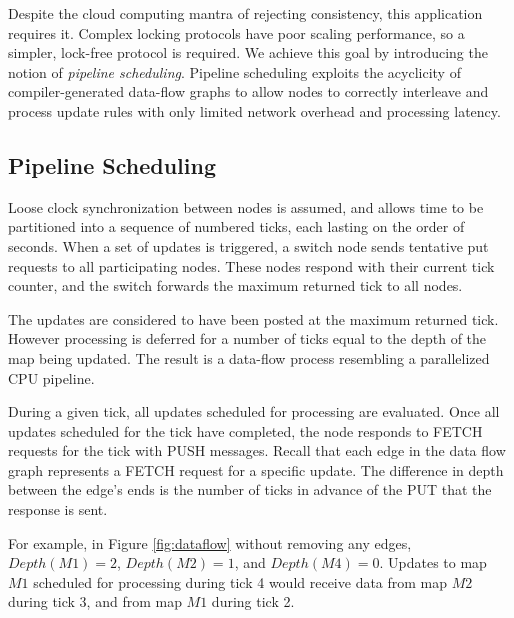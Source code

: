 \documentclass{sig-alternate}
\begin{document}
Despite the cloud computing mantra of rejecting consistency, this application requires it.  Complex locking protocols have poor scaling performance, so a simpler, lock-free protocol is required.  We achieve this goal by introducing the notion of \textit{pipeline scheduling}.  Pipeline scheduling exploits the acyclicity of compiler-generated data-flow graphs to allow nodes to correctly interleave and process update rules with only limited network overhead and processing latency.

\subsection{Pipeline Scheduling}
Loose clock synchronization between nodes is assumed, and allows time to be partitioned into a sequence of numbered ticks, each lasting on the order of seconds.  When a set of updates is triggered, a switch node sends tentative put requests to all participating nodes.  These nodes respond with their current tick counter, and the switch forwards the maximum returned tick to all nodes.

The updates are considered to have been posted at the maximum returned tick.  However processing is deferred for a number of ticks equal to the depth of the map being updated.  The result is a data-flow process resembling a parallelized CPU pipeline.

During a given tick, all updates scheduled for processing are evaluated.  Once all updates scheduled for the tick have completed, the node responds to FETCH requests for the tick with PUSH messages.  Recall that each edge in the data flow graph represents a FETCH request for a specific update.  The difference in depth between the edge's ends is the number of ticks in advance of the PUT that the response is sent.  

For example, in Figure \ref{fig:dataflow} without removing any edges, $Depth(M1) = 2$, $Depth(M2) = 1$, and $Depth(M4) = 0$.  Updates to map $M1$ scheduled for processing during tick 4 would receive data from map $M2$ during tick 3, and from map $M1$ during tick 2.

%
%
%
%
%
%
\end{document}
